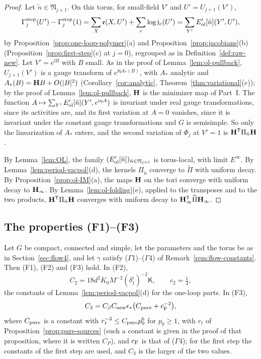 \begin{proof}
Let $\tilde n\in\mathfrak N_{j+1}$. On this torus, for small-field $V'$ and $U'=U_{j+1}(V')$,
\[
\Gamma^{\rm step}_j(U')-\Gamma^{\rm step}_j(1)=\sum_X\mathfrak e(X,U')+\sum_c\log\mathfrak j_c(U')=\sum_{Y'}E'_{\rm ol}[\tilde n](Y',U'),
\]
by Proposition~\ref{prop:one-loop-polymer}(a) and Proposition~\ref{prop:jacobians}(b) (Proposition~\ref{prop:first-step}(c) at $j=0$), regrouped as in Definition~\ref{def:raw-new}. Let $V'=e^{\ii B}$ with $B$ small. As in the proof of Lemma~\ref{lem:ol-pullback}, $U_{j+1}(V')$ is a gauge transform of $e^{\ii\eta A_*(B)}$, with $A_*$ analytic and $A_*(B)=\mathbf H B+O(|B|^2)$ (Corollary~\ref{cor:analytic}, Theorem~\ref{thm:variational}(c)); by the proof of Lemma~\ref{lem:ol-pullback}, $\mathbf H$ is the minimizer map of Part~I. The function $A\mapsto\sum_{Y'}E'_{\rm ol}[\tilde n](Y',e^{\mathrm i\eta A})$ is invariant under real gauge transformations, since its activities are, and its first variation at $A=0$ vanishes, since it is invariant under the constant gauge transformations and $G$ is semisimple. So only the linearization of $A_*$ enters, and the second variation of $\Phi_j$ at $V'=1$ is $\mathbf H^{\sf T}\Pi_{\tilde n}\mathbf H$.

By Lemma~\ref{lem:OL}, the family $(E'_{\rm ol}[\tilde n])_{\tilde n\in\mathfrak N_{j+1}}$ is torus-local, with limit $E^\infty$. By Lemma~\ref{lem:period-vacpol}(d), the kernels $\Pi_{\tilde n}$ converge to $\widetilde\Pi$ with uniform decay. By Proposition~\ref{prop:ol-IM}(a), the maps $\mathbf H$ on the tori converge with uniform decay to $\mathbf H_\infty$. By Lemma~\ref{lem:ol-folding}(e), applied to the transposes and to the two products, $\mathbf H^{\sf T}\Pi_{\tilde n}\mathbf H$ converges with uniform decay to $\mathbf H_\infty^{\sf T}\widetilde\Pi\mathbf H_\infty$.
\end{proof}

\subsection{The properties (F1)--(F3)}\label{subsec:ol-flow-F}

\begin{proposition}\label{prop:flow-F}
Let $G$ be compact, connected and simple, let the parameters and the torus be as in Section~\ref{sec:flow4}, and let $\gamma$ satisfy ($\Gamma$1)--($\Gamma$4) of Remark~\ref{rem:flow-constants}. Then (F1), (F2) and (F3) hold. In (F2),
\[
C_2=18d^2K_0M^{-2}(\delta_1^\flat)^{-2}\mathsf K,\qquad c_2=\tfrac14,
\]
the constants of Lemma~\ref{lem:period-vacpol}(d) for the one-loop parts. In (F3),
\[
C_3=C_\beta C_{\rm new}\epsilon_*\big(C_{\rm pure}+c_{\rm F}^{-2}\big),
\]
where $C_{\rm pure}$ is a constant with $r_t^{-2}\le C_{\rm pure}p_0^6$ for $p_0\ge1$, with $r_t$ of Proposition~\ref{prop:pure-sources} (such a constant is given in the proof of that proposition, where it is written $C_P$), and $c_{\rm F}$ is that of ($\Gamma$4); for the first step the constants of the first step are used, and $C_3$ is the larger of the two values.
\end{proposition}

